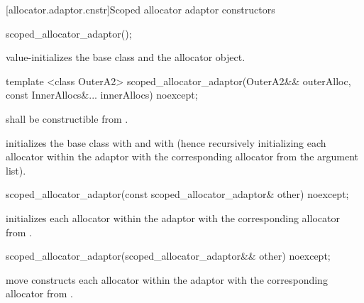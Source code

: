 [allocator.adaptor.cnstr]{Scoped allocator adaptor constructors}

%
\begin{itemdecl}
scoped_allocator_adaptor();
\end{itemdecl}

\begin{itemdescr}
\pnum
\effects value-initializes the  base class and the  allocator
object.
\end{itemdescr}

%
\begin{itemdecl}
template <class OuterA2>
  scoped_allocator_adaptor(OuterA2&& outerAlloc,
                           const InnerAllocs&... innerAllocs) noexcept;
\end{itemdecl}

\begin{itemdescr}
\pnum
\requires {} shall be constructible from .

\pnum
\effects initializes the  base class with
 and  with 
(hence recursively initializing each allocator within the adaptor with the corresponding
allocator from the argument list).
\end{itemdescr}

%
\begin{itemdecl}
scoped_allocator_adaptor(const scoped_allocator_adaptor& other) noexcept;
\end{itemdecl}

\begin{itemdescr}
\pnum
\effects initializes each allocator within the adaptor with the corresponding allocator
from .
\end{itemdescr}

%
\begin{itemdecl}
scoped_allocator_adaptor(scoped_allocator_adaptor&& other) noexcept;
\end{itemdecl}

\begin{itemdescr}
\pnum
\effects move constructs each allocator within the adaptor with the corresponding allocator
from .
\end{itemdescr}

